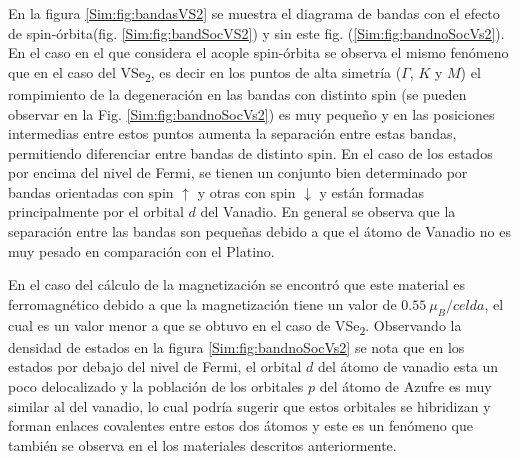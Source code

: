 \par En la figura \ref{Sim:fig:bandasVS2} se muestra el diagrama de bandas  con el efecto de spin-\'orbita(fig. \ref{Sim:fig:bandSocVS2}) y sin este fig. (\ref{Sim:fig:bandnoSocVs2}). En el caso en el que considera el acople spin-\'orbita se observa el mismo fen\'omeno que en el caso del VSe\textsubscript{2}, es decir en los puntos de alta simetr\'ia ($\Gamma$, $K$ y $M$) el rompimiento de la degeneraci\'on en las bandas con distinto spin (se pueden observar en la Fig. \ref{Sim:fig:bandnoSocVs2}) es muy peque\~no y en las posiciones intermedias entre estos puntos aumenta la separaci\'on entre estas bandas,  permitiendo diferenciar entre bandas de distinto spin. En el caso de los estados por encima del nivel de Fermi, se tienen un conjunto bien determinado por bandas orientadas con spin $\uparrow$ y otras con spin $\downarrow$ y est\'an formadas principalmente por el orbital $d$ del Vanadio. En general se observa que la separaci\'on entre las bandas son peque\~nas debido a que el \'atomo de Vanadio no es muy pesado en comparaci\'on con el Platino.
\newline %
\par En el caso del c\'alculo de la magnetizaci\'on se encontr\'o que este material es ferromagn\'etico debido a que la magnetizaci\'on tiene un valor de $0.55 ~\mu_{B}/celda$, el cual es un valor menor a que se obtuvo en el caso de VSe\textsubscript{2}. Observando la densidad de estados en la figura \ref{Sim:fig:bandnoSocVs2} se nota que en los estados por debajo del nivel de Fermi, el orbital $d$ del \'atomo de vanadio esta un poco delocalizado y  la poblaci\'on de los orbitales $p$ del \'atomo de Azufre es muy similar al del vanadio, lo cual podr\'ia sugerir que estos orbitales se hibridizan  y forman enlaces covalentes entre estos dos \'atomos y este es un fen\'omeno que tambi\'en se observa en el los materiales descritos anteriormente.
